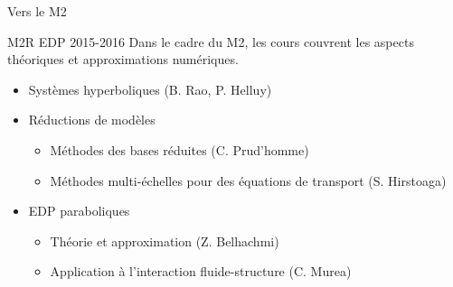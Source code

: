 \documentclass{beamer}
\begin{document}
\begin{frame}{Vers le M2}

  \begin{block}{M2R EDP 2015-2016}
    Dans le cadre du M2, les cours couvrent les aspects théoriques et
    approximations numériques.
    \begin{itemize}
    \item Systèmes hyperboliques (B. Rao, P. Helluy)
    \item Réductions de modèles
      \begin{itemize}
      \item Méthodes des bases réduites (C. Prud'homme)
      \item Méthodes multi-échelles pour des équations de transport (S. Hirstoaga)
      \end{itemize}
    \item EDP paraboliques
      \begin{itemize}
      \item Théorie et approximation (Z. Belhachmi)
      \item Application à l'interaction
        fluide-structure (C. Murea)
      \end{itemize}
    \end{itemize}
  \end{block}

\end{frame}
\end{document}
